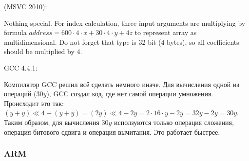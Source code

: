  (MSVC 2010):



{Nothing special. For index calculation, three input arguments are multiplying 
by formula $address=600 \cdot 4 \cdot x + 30 \cdot 4 \cdot y + 4z$ to represent array as multidimensional.
Do not forget that \Tint type is 32-bit (4 bytes), so all coefficients should be multiplied by 4.}

GCC 4.4.1:



Компилятор GCC решил всё сделать немного иначе. 
Для вычисления одной из операций ($30y$), GCC создал код, где нет самой операции умножения. 
Происходит это так: $(y+y) \ll 4 - (y+y) = (2y) \ll 4 - 2y = 2 \cdot 16 \cdot y - 2y = 32y - 2y = 30y$. 
Таким образом, для вычисления $30y$
исползуются только операция сложения, операция битового сдвига и операция вычитания. Это работает быстрее.

\subsubsection{ARM}


